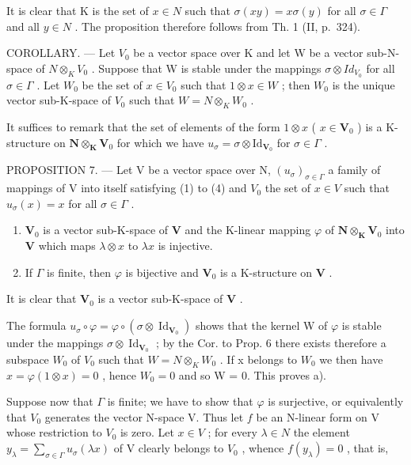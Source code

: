 It is clear that K is the set of \(x \in N\) such that \(\sigma(xy) = x\sigma(y)\) for all \(\sigma \in \Gamma\) and all \(y \in N\) . The proposition therefore follows from Th. 1 (II, p.~324).

COROLLARY. --- Let \(V_{0}\) be a vector space over K and let W be a vector sub-N-space of \(N \otimes_{K} V_{0}\) . Suppose that W is stable under the mappings \(\sigma \otimes Id_{V_{0}}\) for all \(\sigma \in \Gamma\) . Let \(W_{0}\) be the set of \(x \in V_{0}\) such that \(1 \otimes x \in W\) ; then \(W_{0}\) is the unique vector sub-K-space of \(V_{0}\) such that \(W = N \otimes_{K} W_{0}\) .

It suffices to remark that the set of elements of the form \(1 \otimes x\) ( \(x \in \mathbf{V}_0\) ) is a K-structure on \(\mathbf{N} \otimes_{\mathbf{K}} \mathbf{V}_0\) for which we have \(u_\sigma = \sigma \otimes \mathrm{Id}_{\mathbf{V}_0}\) for \(\sigma \in \Gamma\) .

PROPOSITION 7. --- Let V be a vector space over N, \((u_{\sigma})_{\sigma \in \Gamma}\) a family of mappings of V into itself satisfying (1) to (4) and \(V_{0}\) the set of \(x \in V\) such that \(u_{\sigma}(x) = x\) for all \(\sigma \in \Gamma\) .

\begin{enumerate}
\def\labelenumi{\alph{enumi})}
\item
  \(\mathbf{V}_0\) is a vector sub-K-space of \(\mathbf{V}\) and the K-linear mapping \(\varphi\) of \(\mathbf{N} \otimes_{\mathbf{K}} \mathbf{V}_0\) into \(\mathbf{V}\) which maps \(\lambda \otimes x\) to \(\lambda x\) is injective.
\item
  If \(\Gamma\) is finite, then \(\varphi\) is bijective and \(\mathbf{V}_0\) is a K-structure on \(\mathbf{V}\) .
\end{enumerate}

It is clear that \(\mathbf{V}_0\) is a vector sub-K-space of \(\mathbf{V}\) .

The formula \(u_{\sigma} \circ \varphi = \varphi \circ (\sigma \otimes \operatorname{Id}_{\mathbf{V}_{0}})\) shows that the kernel W of \(\varphi\) is stable under the mappings \(\sigma \otimes \operatorname{Id}_{\mathbf{V}_{0}}\) ; by the Cor. to Prop. 6 there exists therefore a subspace \(W_{0}\) of \(V_{0}\) such that \(W = N \otimes_{K} W_{0}\) . If x belongs to \(W_{0}\) we then have \(x = \varphi(1 \otimes x) = 0\) , hence \(W_{0} = 0\) and so W = 0. This proves a).

Suppose now that \(\Gamma\) is finite; we have to show that \(\varphi\) is surjective, or equivalently that \(V_0\) generates the vector N-space V. Thus let \(f\) be an N-linear form on V whose restriction to \(V_0\) is zero. Let \(x \in V\) ; for every \(\lambda \in N\) the element \(y_\lambda = \sum_{\sigma \in \Gamma} u_\sigma(\lambda x)\) of V clearly belongs to \(V_0\) , whence \(f(y_\lambda) = 0\) , that is,


